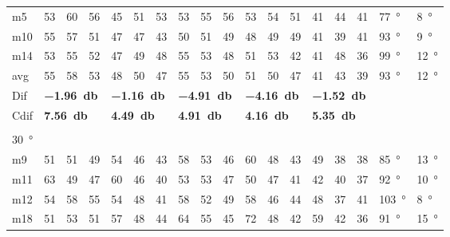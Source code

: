 \begin{table}[H]
\begin{tabular}{l|l|l|l|l|l|l|l|l|l|l|l|l|l|l|l|l|l}
m5    &  53    &  60    &  56    &  45    &  51    & 53     &   53   &  55     &  56    &  53     &  54    &   51   & 41 & 44 &41   & \SI{77}{\degree} & \SI{8}{\degree} \\
m10  &  55    &  57    &  51    &  47    &   47   &   43   &   50   &   51    &   49   &  48     & 49     & 49     & 41 & 39 &41  & \SI{93}{\degree} & \SI{9}{\degree}  \\
m14  &  53    &  55    &  52    &  47    &  49    &   48   &    55  &  53     &   48   &  51     &  53    &  42    & 41 & 48 & 36  & \SI{99}{\degree} & \SI{12}{\degree} \\ \hline
avg & 55     &  58    &  53    &   48   &  50    &  47    &  55    &   53    &  50    &  51     & 50     &  47    & 41 & 43  & 39   & \SI{93}{\degree} & \SI{12}{\degree} \\ \hline  
Dif & \multicolumn{3}{l|}{\textbf{\SI{-1.96}{\decibel}}} & \multicolumn{3}{l|}{\textbf{\SI{-1.16}{\decibel}}} & \multicolumn{3}{l|}{\textbf{\SI{-4.91}{\decibel}}} & \multicolumn{3}{l|}{\textbf{\SI{-4.16}{\decibel}}} &  \multicolumn{3}{l|}{\textbf{\SI{-1.52}{\decibel}}} &  \multicolumn{2}{l}{}  \\ \hline 
Cdif & \multicolumn{3}{l|}{\textbf{\SI{7.56}{\decibel}}} & \multicolumn{3}{l|}{\textbf{\SI{4.49}{\decibel}}} & \multicolumn{3}{l|}{\textbf{\SI{4.91}{\decibel}}} & \multicolumn{3}{l|}{\textbf{\SI{4.16}{\decibel}}} & \multicolumn{3}{l|}{\textbf{\SI{5.35}{\decibel}}}  &   \multicolumn{2}{l}{}   \\ 
 \multicolumn{18}{l}{ } \\                         
\SI{30}{\degree}   & \multicolumn{3}{l|}{} & \multicolumn{3}{l|}{} & \multicolumn{3}{l|}{} & \multicolumn{3}{l|}{} &  \multicolumn{3}{l|}{}   &  \multicolumn{2}{l}{} \\  \hline
m9    &  51    &  51    &  49    &  54    &  46    &   43   &  58    &   53    &  46    &   60    &   48   &   43   & 49 & 38 & 38  & \SI{85}{\degree} & \SI{13}{\degree} \\
m11  &  63    &  49    &  47    &   60   &   46   &   40   &  53    &   53    &  47    &    50   &   47   &  41   & 42 & 40 & 37  & \SI{92}{\degree} & \SI{10}{\degree} \\
m12  &  54    &   58   &  55    &  54    &   48   &   41   &   58   &  52     &   49   &    58   &   46   &   44   & 48 & 37 & 41  & \SI{103}{\degree} & \SI{8}{\degree} \\
m18  &  51    &   53   &  51    &   57   &  48    &   44   &   64   &   55    &  45    &    72   &  48    &   42   & 59 & 42 & 36  & \SI{91}{\degree} & \SI{15}{\degree} \\ \hline

\end{tabular}
\end{table}
